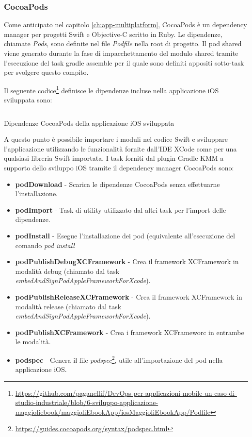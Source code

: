 \subsubsection*{CocoaPods}
Come anticipato nel capitolo \ref{ch:app-multiplatform}, CocoaPods è un dependency manager per progetti Swift e Objective-C scritto in Ruby. Le dipendenze, chiamate \textit{Pods}, sono definite nel file \textit{Podfile} nella root di progetto. Il pod shared viene generato durante la fase di impacchettamento del modulo shared tramite l’esecuzione del task gradle assemble per il quale sono definiti appositi sotto-task per svolgere questo compito.

Il seguente codice\footnote{\href{https://github.com/paganellif/DevOps-per-applicazioni-mobile-un-caso-di-studio-industriale/blob/6-sviluppo-applicazione-maggioliebook/maggioliEbookApp/iosMaggioliEbookApp/Podfile}{https://github.com/paganellif/DevOps-per-applicazioni-mobile-un-caso-di-studio-industriale/blob/6-sviluppo-applicazione-maggioliebook/maggioliEbookApp/iosMaggioliEbookApp/Podfile}} definisce le dipendenze incluse nella applicazione iOS sviluppata sono:

\begin{listing}[H]
    \inputminted{ruby}{code/Podfile}
    \caption{Dipendenze CocoaPods della applicazione iOS sviluppata}
\end{listing}

A questo punto è possibile importare i moduli nel codice Swift e sviluppare l'applicazione utilizzando le funzionalità fornite dall'IDE XCode come per una qualsiasi libreria Swift importata. I task forniti dal plugin Gradle KMM a supporto dello sviluppo iOS tramite il dependency manager CocoaPods sono:

\begin{itemize}
    \item \textbf{podDownload} - Scarica le dipendenze CocoaPods senza effettuarne l'installazione.
    \item \textbf{podImport} - Task di utility utilizzato dal altri task per l'import delle dipendenze.
    \item \textbf{podInstall} - Esegue l'installazione dei pod (equivalente all'esecuzione del comando \textit{pod install}
    \item \textbf{podPublishDebugXCFramework} - Crea il framework XCFramework in modalità debug (chiamato dal task \textit{embedAndSignPodAppleFrameworkForXcode}).
    \item \textbf{podPublishReleaseXCFramework} - Crea il framework XCFramework in modalità release (chiamato dal task \textit{embedAndSignPodAppleFrameworkForXcode}).
    \item \textbf{podPublishXCFramework} - Crea i framework XCFrameworc in entrambe le modalità.
    \item \textbf{podspec} - Genera il file \textit{podspec}\footnote{\href{https://guides.cocoapods.org/syntax/podspec.html}{https://guides.cocoapods.org/syntax/podspec.html}}, utile all'importazione del pod nella applicazione iOS.
\end{itemize}

